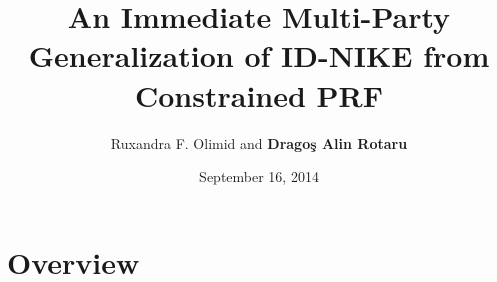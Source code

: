 \documentclass{beamer}
\title[University of Bucharest]{An Immediate Multi-Party Generalization of ID-NIKE from Constrained PRF}
\author[R.F.Olimid, D.A.Rotaru]{Ruxandra F. Olimid and \textbf{Drago\c{s} Alin Rotaru}} %
\institute[UniBuc] %
{
University of Bucharest\\ %
}
\date{September 16, 2014} %
\begin{document}
\begin{frame}
\titlepage %
\end{frame}



\section{Overview} %
\end{document}
